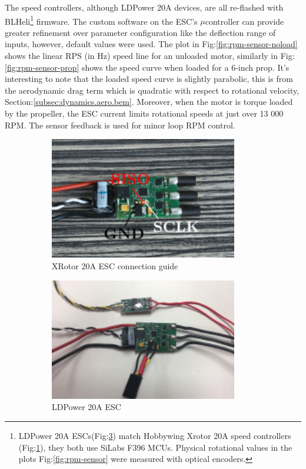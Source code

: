 \par
The speed controllers, although LDPower 20A devices, are all re-flashed with BLHeli\footnote{LDPower 20A ESCs(Fig:\ref{fig:ldpower-20A}) match Hobbywing Xrotor 20A speed controllers (Fig:\ref{fig:xrotor-20A}), they both use SiLabs F396 MCUs. Physical rotational values in the plots Fig:\ref{fig:rpm-sensor} were measured with optical encoders.}\cite{BLHeli} firmware. The custom software on the ESC's $\mu$controller can provide greater refinement over parameter configuration like the deflection range of inputs, however, default values were used. The plot in Fig:\ref{fig:rpm-sensor-noload} shows the linear RPS (in Hz) speed line for an unloaded motor, similarly in Fig:\ref{fig:rpm-sensor-prop} shows the speed curve when loaded for a 6-inch prop. It's interesting to note that the loaded speed curve is slightly parabolic, this is from the aerodynamic drag term which is quadratic with respect to rotational velocity, Section:\ref{subsec:dynamics.aero.bem}. Moreover, when the motor is torque loaded by the propeller, the ESC current limits rotational speeds at just over 13 000 RPM. The sensor feedback is used for minor loop RPM control.
\begin{figure}[hbtp]
\begin{subfigure}{0.5\textwidth}
\centering
\includegraphics[width=0.9\textwidth]{figs/xrotor-20A}
\caption{XRotor 20A ESC connection guide\cite{xrotor}}
\label{fig:xrotor-20A}
\end{subfigure}
\begin{subfigure}{0.5\textwidth}
\centering
\includegraphics[width=0.9\textwidth]{figs/ldpower-20A}
\caption{LDPower 20A ESC}
\label{fig:ldpower-20A}
\end{subfigure}
\caption{}
\end{figure}
